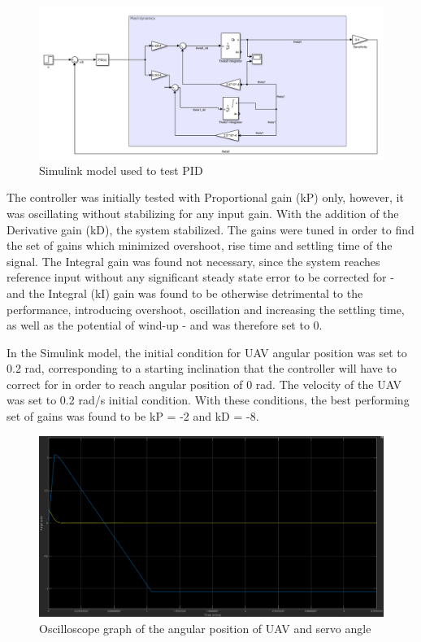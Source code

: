 \begin{figure}[H]
    \centering
    \includegraphics[scale=0.6]{graphics/Control/Simulink.png}
    \caption{Simulink model used to test PID}
     \label{Simulink Model Used to Test PID control}
\end{figure} 

The controller was initially tested with Proportional gain (kP) only, however, it was oscillating without stabilizing for any input gain. With the addition of the Derivative gain (kD), the system stabilized. The gains were tuned in order to find the set of gains which minimized overshoot, rise time and settling time of the signal. The Integral gain was found not necessary, since the system reaches reference input without any significant steady state error to be corrected for - and the Integral (kI) gain was found to be otherwise detrimental to the performance, introducing overshoot, oscillation and increasing the settling time, as well as the potential of wind-up - and was therefore set to 0. 

In the Simulink model, the initial condition for UAV angular position was set to 0.2 rad, corresponding to a starting inclination that the controller will have to correct for in order to reach angular position of 0 rad. The velocity of the UAV was set to 0.2 rad/s initial condition. With these conditions, the best performing set of gains was found to be kP = -2 and kD = -8.  

\begin{figure}[H]
    \centering
    \includegraphics[scale=0.3]{graphics/Control/TSP2D6.png}
    \caption{Oscilloscope graph of the angular position of UAV and servo angle}
     \label{fig:Oscilloscope graph of the angular position of UAV and servo angle}
\end{figure} 

